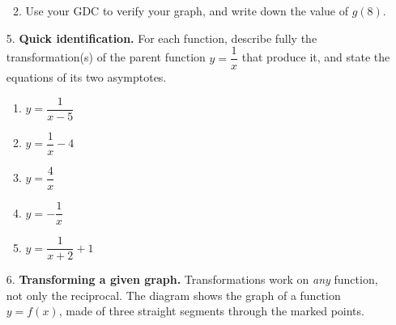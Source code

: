 \documentclass[12pt, twoside]{article}
\begin{document}
\begin{enumerate}[itemsep=0.4cm]
\begin{enumerate}[label=(\alph*), itemsep=0.3cm]
  \vspace{3.0cm}

  \item Use your GDC to verify your graph, and write down the value of $g(8)$.

  \vspace{2.0cm}
\end{enumerate}

\newpage

\item[5.] \textbf{Quick identification.} For each function, describe fully the
transformation(s) of the parent function $y=\dfrac{1}{x}$ that produce it, and
state the equations of its two asymptotes.

\begin{enumerate}[label=(\alph*), itemsep=0.7cm]
  \item $\displaystyle y=\dfrac{1}{x-5}$
  \vspace{1.4cm}

  \item $\displaystyle y=\dfrac{1}{x}-4$
  \vspace{1.4cm}

  \item $\displaystyle y=\dfrac{4}{x}$
  \vspace{1.4cm}

  \item $\displaystyle y=-\dfrac{1}{x}$
  \vspace{1.4cm}

  \item $\displaystyle y=\dfrac{1}{x+2}+1$
\end{enumerate}

\newpage

\item[6.] \textbf{Transforming a given graph.} Transformations work on
\emph{any} function, not only the reciprocal. The diagram shows the graph of a
function $y=f(x)$, made of three straight segments through the marked points.

\begin{figure}[H]
\begin{center}
\end{center}
\end{figure}
\end{enumerate}
\end{document}
